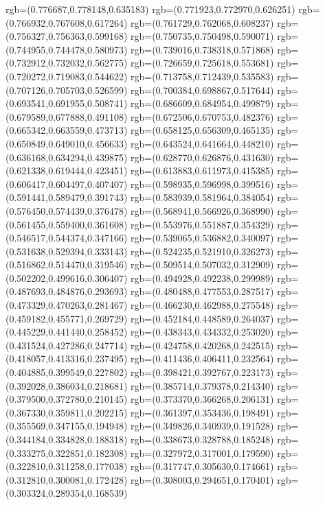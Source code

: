 {{{			rgb=(0.776687,0.778148,0.635183)
			rgb=(0.771923,0.772970,0.626251)
			rgb=(0.766932,0.767608,0.617264)
			rgb=(0.761729,0.762068,0.608237)
			rgb=(0.756327,0.756363,0.599168)
			rgb=(0.750735,0.750498,0.590071)
			rgb=(0.744955,0.744478,0.580973)
			rgb=(0.739016,0.738318,0.571868)
			rgb=(0.732912,0.732032,0.562775)
			rgb=(0.726659,0.725618,0.553681)
			rgb=(0.720272,0.719083,0.544622)
			rgb=(0.713758,0.712439,0.535583)
			rgb=(0.707126,0.705703,0.526599)
			rgb=(0.700384,0.698867,0.517644)
			rgb=(0.693541,0.691955,0.508741)
			rgb=(0.686609,0.684954,0.499879)
			rgb=(0.679589,0.677888,0.491108)
			rgb=(0.672506,0.670753,0.482376)
			rgb=(0.665342,0.663559,0.473713)
			rgb=(0.658125,0.656309,0.465135)
			rgb=(0.650849,0.649010,0.456633)
			rgb=(0.643524,0.641664,0.448210)
			rgb=(0.636168,0.634294,0.439875)
			rgb=(0.628770,0.626876,0.431630)
			rgb=(0.621338,0.619444,0.423451)
			rgb=(0.613883,0.611973,0.415385)
			rgb=(0.606417,0.604497,0.407407)
			rgb=(0.598935,0.596998,0.399516)
			rgb=(0.591441,0.589479,0.391743)
			rgb=(0.583939,0.581964,0.384054)
			rgb=(0.576450,0.574439,0.376478)
			rgb=(0.568941,0.566926,0.368990)
			rgb=(0.561455,0.559400,0.361608)
			rgb=(0.553976,0.551887,0.354329)
			rgb=(0.546517,0.544374,0.347166)
			rgb=(0.539065,0.536882,0.340097)
			rgb=(0.531638,0.529394,0.333143)
			rgb=(0.524235,0.521910,0.326273)
			rgb=(0.516862,0.514470,0.319546)
			rgb=(0.509514,0.507032,0.312909)
			rgb=(0.502202,0.499616,0.306407)
			rgb=(0.494928,0.492238,0.299989)
			rgb=(0.487693,0.484876,0.293693)
			rgb=(0.480488,0.477553,0.287517)
			rgb=(0.473329,0.470263,0.281467)
			rgb=(0.466230,0.462988,0.275548)
			rgb=(0.459182,0.455771,0.269729)
			rgb=(0.452184,0.448589,0.264037)
			rgb=(0.445229,0.441440,0.258452)
			rgb=(0.438343,0.434332,0.253020)
			rgb=(0.431524,0.427286,0.247714)
			rgb=(0.424758,0.420268,0.242515)
			rgb=(0.418057,0.413316,0.237495)
			rgb=(0.411436,0.406411,0.232564)
			rgb=(0.404885,0.399549,0.227802)
			rgb=(0.398421,0.392767,0.223173)
			rgb=(0.392028,0.386034,0.218681)
			rgb=(0.385714,0.379378,0.214340)
			rgb=(0.379500,0.372780,0.210145)
			rgb=(0.373370,0.366268,0.206131)
			rgb=(0.367330,0.359811,0.202215)
			rgb=(0.361397,0.353436,0.198491)
			rgb=(0.355569,0.347155,0.194948)
			rgb=(0.349826,0.340939,0.191528)
			rgb=(0.344184,0.334828,0.188318)
			rgb=(0.338673,0.328788,0.185248)
			rgb=(0.333275,0.322851,0.182308)
			rgb=(0.327972,0.317001,0.179590)
			rgb=(0.322810,0.311258,0.177038)
			rgb=(0.317747,0.305630,0.174661)
			rgb=(0.312810,0.300081,0.172428)
			rgb=(0.308003,0.294651,0.170401)
			rgb=(0.303324,0.289354,0.168539)
}}}
